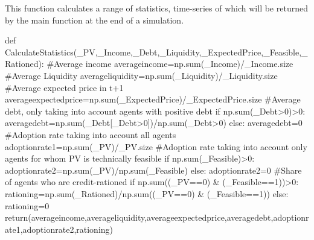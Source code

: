 \documentclass[
  letterpaper,
  DIV=11,
  numbers=noendperiod]{scrartcl}
\newenvironment{Shaded}{\begin{snugshade}}{\end{snugshade}}
\newcommand{\BuiltInTok}[1]{\textcolor[rgb]{0.00,0.23,0.31}{#1}}
\newcommand{\CommentTok}[1]{\textcolor[rgb]{0.37,0.37,0.37}{#1}}
\newcommand{\ControlFlowTok}[1]{\textcolor[rgb]{0.00,0.23,0.31}{#1}}
\newcommand{\DecValTok}[1]{\textcolor[rgb]{0.68,0.00,0.00}{#1}}
\newcommand{\KeywordTok}[1]{\textcolor[rgb]{0.00,0.23,0.31}{#1}}
\newcommand{\NormalTok}[1]{\textcolor[rgb]{0.00,0.23,0.31}{#1}}
\newcommand{\OperatorTok}[1]{\textcolor[rgb]{0.37,0.37,0.37}{#1}}
\begin{document}
This function calculates a range of statistics, time-series of which
will be returned by the main function at the end of a simulation.

\begin{Shaded}
\begin{Highlighting}[]
\KeywordTok{def}\NormalTok{ CalculateStatistics(\_PV,\_Income,\_Debt,\_Liquidity,\_ExpectedPrice,\_Feasible,\_Rationed):}
    \CommentTok{\#Average income}
\NormalTok{    averageincome}\OperatorTok{=}\NormalTok{np.}\BuiltInTok{sum}\NormalTok{(\_Income)}\OperatorTok{/}\NormalTok{\_Income.size}
    \CommentTok{\#Average Liquidity}
\NormalTok{    averageliquidity}\OperatorTok{=}\NormalTok{np.}\BuiltInTok{sum}\NormalTok{(\_Liquidity)}\OperatorTok{/}\NormalTok{\_Liquidity.size}
    \CommentTok{\#Average expected price in t+1}
\NormalTok{    averageexpectedprice}\OperatorTok{=}\NormalTok{np.}\BuiltInTok{sum}\NormalTok{(\_ExpectedPrice)}\OperatorTok{/}\NormalTok{\_ExpectedPrice.size}
    \CommentTok{\#Average debt, only taking into account agents with positive debt}
    \ControlFlowTok{if}\NormalTok{ np.}\BuiltInTok{sum}\NormalTok{(\_Debt}\OperatorTok{\textgreater{}}\DecValTok{0}\NormalTok{)}\OperatorTok{\textgreater{}}\DecValTok{0}\NormalTok{:}
\NormalTok{        averagedebt}\OperatorTok{=}\NormalTok{np.}\BuiltInTok{sum}\NormalTok{(\_Debt[\_Debt}\OperatorTok{\textgreater{}}\DecValTok{0}\NormalTok{])}\OperatorTok{/}\NormalTok{np.}\BuiltInTok{sum}\NormalTok{(\_Debt}\OperatorTok{\textgreater{}}\DecValTok{0}\NormalTok{)}
    \ControlFlowTok{else}\NormalTok{:}
\NormalTok{        averagedebt}\OperatorTok{=}\DecValTok{0}
    \CommentTok{\#Adoption rate taking into account all agents}
\NormalTok{    adoptionrate1}\OperatorTok{=}\NormalTok{np.}\BuiltInTok{sum}\NormalTok{(\_PV)}\OperatorTok{/}\NormalTok{\_PV.size}
    \CommentTok{\#Adoption rate taking into account only agents for whom PV is technically feasible}
    \ControlFlowTok{if}\NormalTok{ np.}\BuiltInTok{sum}\NormalTok{(\_Feasible)}\OperatorTok{\textgreater{}}\DecValTok{0}\NormalTok{:}
\NormalTok{        adoptionrate2}\OperatorTok{=}\NormalTok{np.}\BuiltInTok{sum}\NormalTok{(\_PV)}\OperatorTok{/}\NormalTok{np.}\BuiltInTok{sum}\NormalTok{(\_Feasible)}
    \ControlFlowTok{else}\NormalTok{:}
\NormalTok{        adoptionrate2}\OperatorTok{=}\DecValTok{0}
    \CommentTok{\#Share of agents who are credit{-}rationed}
    \ControlFlowTok{if}\NormalTok{ np.}\BuiltInTok{sum}\NormalTok{((\_PV}\OperatorTok{==}\DecValTok{0}\NormalTok{) }\OperatorTok{\&}\NormalTok{ (\_Feasible}\OperatorTok{==}\DecValTok{1}\NormalTok{))}\OperatorTok{\textgreater{}}\DecValTok{0}\NormalTok{:}
\NormalTok{        rationing}\OperatorTok{=}\NormalTok{np.}\BuiltInTok{sum}\NormalTok{(\_Rationed)}\OperatorTok{/}\NormalTok{np.}\BuiltInTok{sum}\NormalTok{((\_PV}\OperatorTok{==}\DecValTok{0}\NormalTok{) }\OperatorTok{\&}\NormalTok{ (\_Feasible}\OperatorTok{==}\DecValTok{1}\NormalTok{))}
    \ControlFlowTok{else}\NormalTok{:}
\NormalTok{        rationing}\OperatorTok{=}\DecValTok{0}
    \ControlFlowTok{return}\NormalTok{(averageincome,averageliquidity,averageexpectedprice,averagedebt,adoptionrate1,adoptionrate2,rationing)}
\end{Highlighting}
\end{Shaded}
\end{document}

